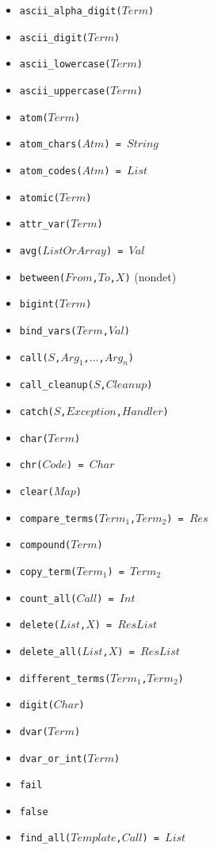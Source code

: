 \documentclass[10pt]{article}
\begin{document}
\begin{multicols}{2}
\begin{scriptsize}
\begin{itemize}
    \item \texttt{ascii\_alpha\_digit($Term$)}
    \item \texttt{ascii\_digit($Term$)}
    \item \texttt{ascii\_lowercase($Term$)}
    \item \texttt{ascii\_uppercase($Term$)}
    \item \texttt{atom($Term$)} 
    \item \texttt{atom\_chars($Atm$) = $String$}
    \item \texttt{atom\_codes($Atm$) = $List$} 
    \item \texttt{atomic($Term$)} 
    \item \texttt{attr\_var($Term$)} 
    \item \texttt{avg($ListOrArray$) = $Val$}
    \item \texttt{between($From$,$To$,$X$)} (nondet)
    \item \texttt{bigint($Term$)}
    \item \texttt{bind\_vars($Term$,$Val$)}
    \item \texttt{call($S$,$Arg_1$,$\ldots$,$Arg_n$)} 
    \item \texttt{call\_cleanup($S$,$Cleanup$)} 
    \item \texttt{catch($S$,$Exception$,$Handler$)} 
    \item \texttt{char($Term$)} 
    \item \texttt{chr($Code$) = $Char$} 
    \item \texttt{clear($Map$)} 
    \item \texttt{compare\_terms($Term_1$,$Term_2$) = $Res$} 
    \item \texttt{compound($Term$)} 
    \item \texttt{copy\_term($Term_1$) = $Term_2$}
    \item \texttt{count\_all($Call$) = $Int$}
    \item \texttt{delete($List$,$X$) = $ResList$}
    \item \texttt{delete\_all($List$,$X$) = $ResList$}
    \item \texttt{different\_terms($Term_1$,$Term_2$)}
    \item \texttt{digit($Char$)}
    \item \texttt{dvar($Term$)}
    \item \texttt{dvar\_or\_int($Term$)}
    \item \texttt{fail}
    \item \texttt{false}
    \item \texttt{find\_all($Template$,$Call$) = $List$}

\end{itemize}
\end{scriptsize}
\end{multicols}
\end{document}

